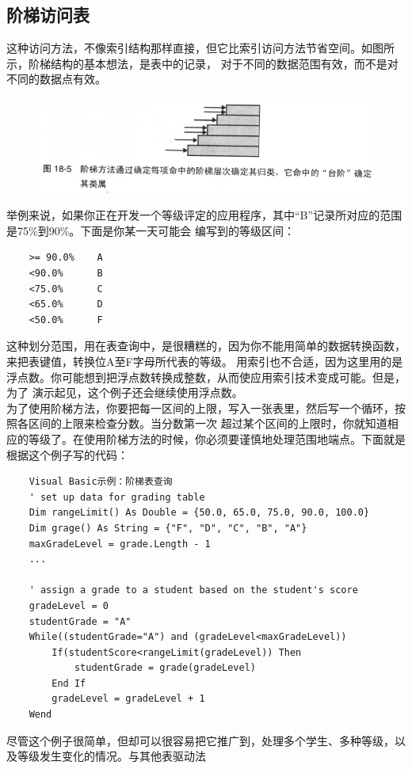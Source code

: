\documentclass{article}
\begin{document}
\subsection{阶梯访问表}
这种访问方法，不像索引结构那样直接，但它比索引访问方法节省空间。如图所示，阶梯结构的基本想法，是表中的记录，
对于不同的数据范围有效，而不是对不同的数据点有效。
\begin{figure}[htb]
    \centering
    \includegraphics[width=15cm]{figure20.png}
\end{figure}
举例来说，如果你正在开发一个等级评定的应用程序，其中“B”记录所对应的范围是75\%到90\%。下面是你某一天可能会
编写到的等级区间：
\begin{lstlisting}
    >= 90.0%    A
    <90.0%      B
    <75.0%      C
    <65.0%      D
    <50.0%      F
\end{lstlisting}
这种划分范围，用在表查询中，是很糟糕的，因为你不能用简单的数据转换函数，来把表键值，转换位A至F字母所代表的等级。
用索引也不合适，因为这里用的是浮点数。你可能想到把浮点数转换成整数，从而使应用索引技术变成可能。但是，为了
演示起见，这个例子还会继续使用浮点数。\\
为了使用阶梯方法，你要把每一区间的上限，写入一张表里，然后写一个循环，按照各区间的上限来检查分数。当分数第一次
超过某个区间的上限时，你就知道相应的等级了。在使用阶梯方法的时候，你必须要谨慎地处理范围地端点。下面就是
根据这个例子写的代码：
\begin{lstlisting}
    Visual Basic示例：阶梯表查询
    ' set up data for grading table
    Dim rangeLimit() As Double = {50.0, 65.0, 75.0, 90.0, 100.0}
    Dim grage() As String = {"F", "D", "C", "B", "A"}
    maxGradeLevel = grade.Length - 1
    ...

    ' assign a grade to a student based on the student's score
    gradeLevel = 0
    studentGrade = "A"
    While((studentGrade="A") and (gradeLevel<maxGradeLevel))
        If(studentScore<rangeLimit(gradeLevel)) Then
            studentGrade = grade(gradeLevel)
        End If
        gradeLevel = gradeLevel + 1
    Wend
\end{lstlisting}
尽管这个例子很简单，但却可以很容易把它推广到，处理多个学生、多种等级，以及等级发生变化的情况。与其他表驱动法
\end{document}
